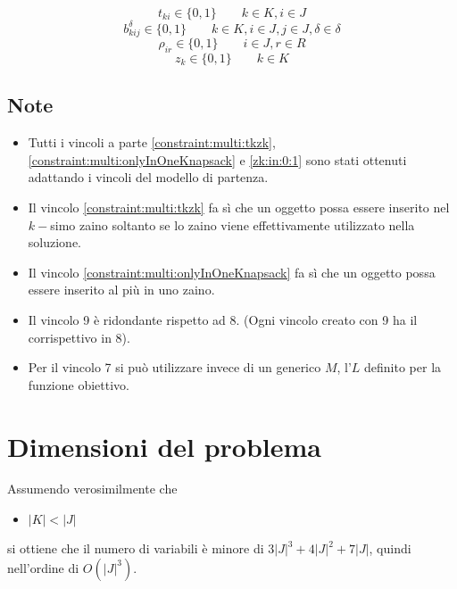 \documentclass{scrartcl}
\begin{document}
\begin{equation}
t_{ki} \in \{0,1\} \quad \quad k \in K, i \in J
\end{equation}
\begin{equation}
b_{kij}^\delta \in \{0,1\} \quad \quad k \in K, i \in J, j \in J, \delta \in \delta
\end{equation}
\begin{equation}
\rho_{ir} \in \{0,1\} \quad\quad i \in J, r \in R
\end{equation}
\begin{equation}
\label{zk:in:0:1}
z_k \in \{0,1\} \quad \quad k \in K
\end{equation}

\subsection{Note}
\begin{itemize}
\item Tutti i vincoli a parte \ref{constraint:multi:tkzk}, \ref{constraint:multi:onlyInOneKnapsack} e \ref{zk:in:0:1} sono stati ottenuti adattando i vincoli del modello di partenza.
\item Il vincolo \ref{constraint:multi:tkzk} fa sì che un oggetto possa essere inserito nel $k-$simo zaino soltanto se lo zaino viene effettivamente utilizzato nella soluzione.
\item Il vincolo \ref{constraint:multi:onlyInOneKnapsack} fa sì che un oggetto possa essere inserito al più in uno zaino. 
\item Il vincolo 9 è ridondante rispetto ad 8. (Ogni vincolo creato con 9 ha il corrispettivo in 8).
\item Per il vincolo 7 si può utilizzare invece di un generico $M$, l'$L$ definito per la funzione obiettivo.
\end{itemize}

\section{Dimensioni del problema}
Assumendo verosimilmente che 
\begin{itemize}
	\item $|K| < |J|$
\end{itemize}  
si ottiene che il numero di variabili è minore di $3|J|^3 + 4|J|^2 + 7|J|$, quindi
nell'ordine di $O(|J|^3)$.
\end{document}
